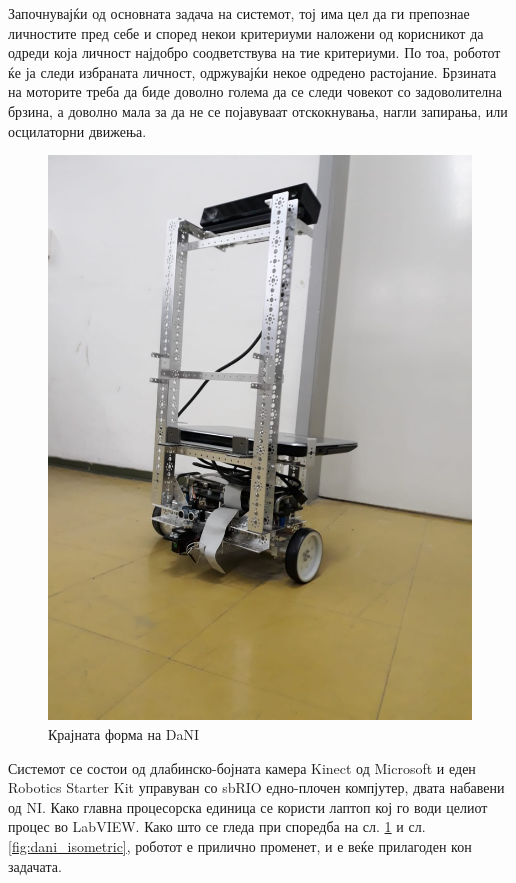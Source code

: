 \documentclass[12pt]{article}
\begin{document}
    Започнувајќи од основната задача на системот, тој има цел да ги препознае личностите пред себе и според некои критериуми наложени од корисникот да одреди која личност најдобро соодветствува на тие критериуми. По тоа, роботот ќе ја следи избраната личност, одржувајќи некое одредено растојание. Брзината на моторите треба да биде доволно голема да се следи човекот со задоволителна брзина, а доволно мала за да не се појавуваат отскокнувања, нагли запирања, или осцилаторни движења.
    \begin{figure}[H]
      \centering
      \label{fig:final_form}
      \includegraphics[width = 0.6\linewidth]{./images/final_form.jpeg}
      \caption{Крајната форма на DaNI}
    \end{figure}
    Системот се состои од длабинско-бојната камера Kinect од Microsoft и еден Robotics Starter Kit управуван со sbRIO едно-плочен компјутер, двата набавени од NI. Како главна процесорска единица се користи лаптоп кој го води целиот процес во LabVIEW. Како што се гледа при споредба на сл. \ref{fig:final_form} и сл. \ref{fig:dani_isometric}, роботот е прилично променет, и е веќе прилагоден кон задачата.
\end{document}
